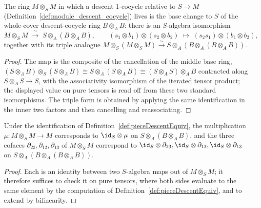 \begin{definition}
  \label{def:pieceDescentEquiv}
  \leanok
  The ring \(M \otimes_S M\) in which a descent \(1\)-cocycle relative to \(S \to M\)
  (Definition~\ref{def:module_descent_cocycle}) lives is the base change to \(S\) of the whole-cover
  descent-cocycle ring \(B \otimes_A B\): there is an \(S\)-algebra isomorphism
  \[
    M \otimes_S M \;\xrightarrow{\ \sim\ }\; S \otimes_A (B \otimes_A B), \qquad
    (s_1 \otimes b_1) \otimes (s_2 \otimes b_2) \;\longmapsto\; (s_2 s_1) \otimes (b_1 \otimes b_2),
  \]
  together with its triple analogue \(M \otimes_S (M \otimes_S M) \xrightarrow{\sim} S \otimes_A (B
  \otimes_A (B \otimes_A B))\).
\end{definition}
\begin{proof}
  \leanok
  The map is the composite of the cancellation of the middle base ring, \((S \otimes_A B)
  \otimes_S (S \otimes_A B) \cong S \otimes_A (S \otimes_A B) \cong (S \otimes_A S) \otimes_A B\)
  contracted along \(S \otimes_A S \to S\), with the associativity isomorphism of the iterated
  tensor product; the displayed value on pure tensors is read off from these two standard
  isomorphisms. The triple form is obtained by applying the same identification in the inner two
  factors and then cancelling and reassociating.
\end{proof}

\begin{lemma}
  \label{lem:pieceDescentEquiv_faces}
  \leanok
  Under the identification of Definition~\ref{def:pieceDescentEquiv}, the multiplication
  \(\mu \colon M \otimes_S M \to M\) corresponds to \(\id_S \otimes \mu\) on \(S \otimes_A (B
  \otimes_A B)\), and the three cofaces \(\partial_{23}, \partial_{12}, \partial_{13}\) of \(M
  \otimes_S M\) correspond to \(\id_S \otimes \partial_{23}, \id_S \otimes \partial_{12}, \id_S
  \otimes \partial_{13}\) on \(S \otimes_A (B \otimes_A (B \otimes_A B))\).
\end{lemma}
\begin{proof}
  \leanok
  Each is an identity between two \(S\)-algebra maps out of \(M \otimes_S M\); it therefore suffices
  to check it on pure tensors, where both sides evaluate to the same element by the computation of
  Definition~\ref{def:pieceDescentEquiv}, and to extend by bilinearity.
\end{proof}

